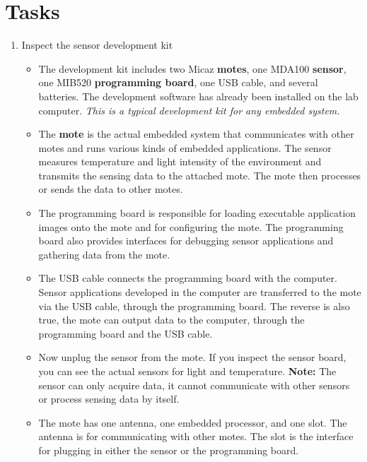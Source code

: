 \documentclass[letterpaper,12pt]{article}
\begin{document}
\section*{Tasks}
\begin{enumerate}
   \item Inspect the sensor development kit
      \begin{itemize}
          \item The development kit includes two Micaz \textbf{motes}, one MDA100 \textbf{sensor},
            one MIB520 \textbf{programming board}, one USB cable, and several batteries.
               The development software has already been installed on the lab computer.
               \textit{This is a typical development kit for any embedded system.}
            \item The \textbf{mote} is the actual embedded system that communicates with
               other motes and runs various kinds of embedded applications. The
               sensor measures temperature and light intensity of the environment
               and transmits the sensing data to the attached mote.
               The mote then processes or sends the data to other motes.
         \item The programming board is responsible for loading executable application
               images onto the mote and for configuring the mote. The programming board
               also provides interfaces for debugging sensor applications and
               gathering data from the mote.
         \item The USB cable connects the programming board with the computer.
               Sensor applications developed in the computer are transferred
               to the mote via the USB cable, through the programming board. The
               reverse is also true, the mote can output data to the computer,
               through the programming board and the USB cable.
         \item Now unplug the sensor from the mote. If you inspect the
               sensor board, you can see the actual sensors for light and temperature.
               \textbf{Note:} The sensor can only acquire data, it cannot communicate with
               other sensors or process sensing data by itself.
         \item The mote has one antenna, one embedded processor, and one slot.
               The antenna is for communicating with other motes. The slot is
               the interface for plugging in either the sensor or the programming board.

\end{itemize}
\end{enumerate}
\end{document}
